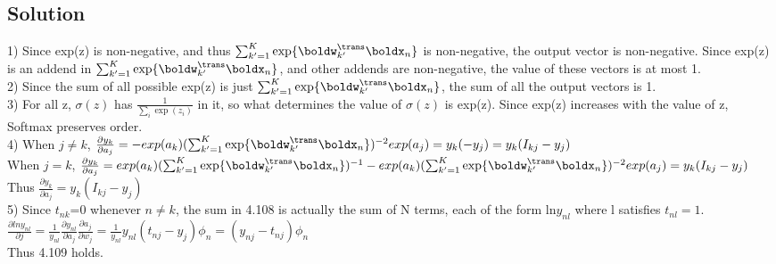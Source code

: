 \documentclass[submit]{harvardml}
\begin{document}
\subsection*{Solution}
1) Since exp(z) is non-negative, and thus $\sum_{k'=1}^K \exp\{ \boldw_{k'}^{\trans}\boldx_n \}$ is non-negative, the output vector is non-negative. Since exp(z) is an addend in $\sum_{k'=1}^K \exp\{ \boldw_{k'}^{\trans}\boldx_n \}$, and other addends are non-negative, the value of these vectors is at most 1. \\

2) Since the sum of all possible exp(z) is just $\sum_{k'=1}^K \exp\{ \boldw_{k'}^{\trans}\boldx_n \}$, the sum of all the output vectors is 1.\\

3) For all z, $\sigma(z)$ has $\frac{1}{\sum_i\exp(z_i)}$ in it, so what determines the value of $\sigma(z)$ is exp(z). Since exp(z) increases with the  value of z, Softmax preserves order.\\

4) When $j\neq k$, $\frac{\partial y_k}{\partial a_j}=-exp(a_k)(\sum_{k'=1}^K \exp\{ \boldw_{k'}^{\trans}\boldx_n \})^{-2}exp(a_j)=y_k(-y_j)=y_k(I_{kj}-y_j)$\\
When $j=k$, $\frac{\partial y_k}{\partial a_j}=exp(a_k)(\sum_{k'=1}^K \exp\{ \boldw_{k'}^{\trans}\boldx_n \})^{-1}-exp(a_k)(\sum_{k'=1}^K \exp\{ \boldw_{k'}^{\trans}\boldx_n \})^{-2}exp(a_j)=y_k(I_{kj}-y_j)$\\
Thus $\frac{\partial y_k}{\partial a_j}=y_k(I_{kj}-y_j)$\\

5) Since $t_{nk}$=0 whenever $n\neq k$, the sum in 4.108 is actually the sum of N terms, each of the form ln$y_{nl}$ where l satisfies $t_{nl}=1$.\\
$\frac{\partial ln y_{nl}}{\partial j}=\frac{1}{y_{nl}} \frac{\partial y_{nl}}{\partial a_{j}}\frac{\partial {a_j}}{\partial w_{j}}=\frac{1}{y_{nl}} y_{nl}(t_{nj}-y_{j})\phi_n=(y_{nj}-t_{nj})\phi_n$\\
Thus 4.109 holds.
\end{document}

